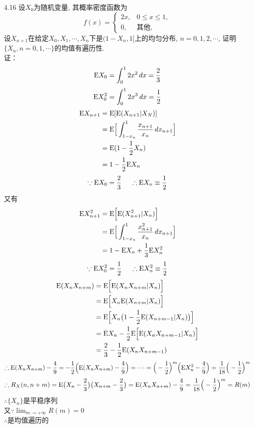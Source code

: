 4.16 设$X_0$为随机变量, 其概率密度函数为
\[
f(x) = 
\begin{cases}
2x,& 0 \leqslant x \leqslant 1,\\
0,& \text{其他},
\end{cases}
\]
设$X_{n+1}$在给定$X_0, X_1, \cdots, X_n$下是$(1-X_n,1]$上的均匀分布, $n=0,1,2,\cdots$, 证明$\{X_n, n=0,1,\cdots\}$的均值有遍历性.\\
证：
\[
\mathrm{E} X_0 = \int^1_02x^2\,dx = \frac{2}{3}
\]
\[
\mathrm{E} X^2_0 = \int^1_02x^3\,dx = \frac{1}{2}
\]
\[
\begin{split}
\mathrm{E} X_{n+1} & = \mathrm{E}[\mathrm{E}(X_{n+1}|X_N)]\\
			& = \mathrm{E}\Big[\int^1_{1-x_n}\frac{x_{n+1}}{x_n}\,dx_{n+1}\Big]\\
			& = \mathrm{E}(1-\frac{1}{2}X_n)\\
			& = 1-\frac{1}{2}\mathrm{E} X_n\\
\end{split}
\]
\[
\because \mathrm{E} X_0 = \frac{2}{3} ~~~~\therefore \mathrm{E} X_n \equiv \frac{1}{2}
\]
又有
\[
\begin{split}
\mathrm{E} X^2_{n+1} & = \mathrm{E}\Big[\mathrm{E}(X^2_{n+1}|X_n)\Big]\\
			& = \mathrm{E} \Big[\int^1_{1-x_n}\frac{x^2_{n+1}}{x_n}\,dx_{n+1}\Big]\\
			& = 1 - \mathrm{E} X_n + \frac{1}{3}\mathrm{E} X^2_n
\end{split}
\]	
\[
\because \mathrm{E} X^2_0 = \frac{1}{2}~~~~\therefore \mathrm{E} X^2_n \equiv \frac{1}{2}
\]
\[
\begin{split}
\mathrm{E}(X_nX_{n+m}) & = \mathrm{E}\Big[\mathrm{E}(X_nX_{n+m}|X_n)\Big]\\
			& = \mathrm{E}\Big[X_n\mathrm{E}(X_{n+m}|X_n)\Big]\\
			& = \mathrm{E}\Big[X_n\big(1-\frac{1}{2}\mathrm{E}(X_{n+m-1}|X_n)\big)\Big]\\
			& = \mathrm{E} X_n - \frac{1}{2}\mathrm{E}\Big[\mathrm{E}(X_nX_{n+m-1}|X_n)\Big]\\
			& = \frac{2}{3} - \frac{1}{2}\mathrm{E}(X_nX_{n+m-1})\\
\end{split}
\]
\[
\begin{split}
\therefore \mathrm{E} (X_nX_{n+m}) - \frac{4}{9} = - \frac{1}{2}\Big(\mathrm{E}(X_nX_{n+m}) -  \frac{4}{9}\Big) = \cdots = \Big(-\frac{1}{2}\Big)^m\Big(\mathrm{E} X^2_n - \frac{4}{9}\Big) = \frac{1}{18}\Big(-\frac{1}{2}\Big)^m
\end{split}
\]
\[
\therefore R_X(n,n+m) = \mathrm{E}\big(X_n - \frac{2}{3}\big)\big(X_{n+m} - \frac{2}{3}\big) = \mathrm{E}(X_nX_{n+m}) - \frac{4}{9}= \frac{1}{18}\Big(-\frac{1}{2}\Big)^m = R(m)
\]
$\therefore \{X_n\}$是平稳序列\\
又$\because \lim_{m\rightarrow +\infty} R(m) = 0$\\
$\therefore$是均值遍历的\\


